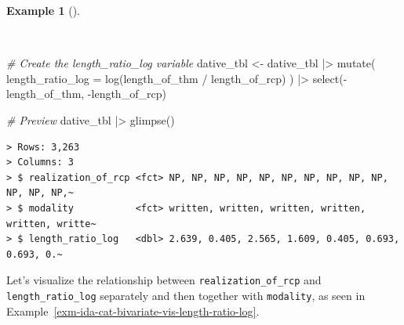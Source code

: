 \documentclass[
  letterpaper,
]{latex/krantz}
\newenvironment{Shaded}{\begin{snugshade}}{\end{snugshade}}
\newcommand{\AttributeTok}[1]{\textcolor[rgb]{0.00,0.00,0.00}{#1}}
\newcommand{\CommentTok}[1]{\textcolor[rgb]{0.00,0.00,0.00}{\textit{#1}}}
\newcommand{\FunctionTok}[1]{\textcolor[rgb]{0.00,0.00,0.00}{#1}}
\newcommand{\NormalTok}[1]{\textcolor[rgb]{0.00,0.00,0.00}{#1}}
\newcommand{\OtherTok}[1]{\textcolor[rgb]{0.00,0.00,0.00}{#1}}
\newcommand{\SpecialCharTok}[1]{\textcolor[rgb]{0.00,0.00,0.00}{#1}}
\theoremstyle{definition}
\newtheorem{example}{Example}[chapter]
\theoremstyle{remark}
\begin{document}
\begin{example}[]\protect\hypertarget{exm-ida-cat-create-length-ratio}{}\label{exm-ida-cat-create-length-ratio}

~

\begin{Shaded}
\begin{Highlighting}[]
\CommentTok{\# Create the \textasciigrave{}length\_ratio\_log\textasciigrave{} variable}
\NormalTok{dative\_tbl }\OtherTok{\textless{}{-}}
\NormalTok{  dative\_tbl }\SpecialCharTok{|\textgreater{}}
  \FunctionTok{mutate}\NormalTok{(}
    \AttributeTok{length\_ratio\_log =} \FunctionTok{log}\NormalTok{(length\_of\_thm }\SpecialCharTok{/}\NormalTok{ length\_of\_rcp)}
\NormalTok{  ) }\SpecialCharTok{|\textgreater{}}
  \FunctionTok{select}\NormalTok{(}\SpecialCharTok{{-}}\NormalTok{length\_of\_thm, }\SpecialCharTok{{-}}\NormalTok{length\_of\_rcp)}

\CommentTok{\# Preview}
\NormalTok{dative\_tbl }\SpecialCharTok{|\textgreater{}} \FunctionTok{glimpse}\NormalTok{()}
\end{Highlighting}
\end{Shaded}

\begin{verbatim}
> Rows: 3,263
> Columns: 3
> $ realization_of_rcp <fct> NP, NP, NP, NP, NP, NP, NP, NP, NP, NP, NP, NP, NP,~
> $ modality           <fct> written, written, written, written, written, writte~
> $ length_ratio_log   <dbl> 2.639, 0.405, 2.565, 1.609, 0.405, 0.693, 0.693, 0.~
\end{verbatim}

\end{example}

Let's visualize the relationship between \texttt{realization\_of\_rcp}
and \texttt{length\_ratio\_log} separately and then together with
\texttt{modality}, as seen in
Example~\ref{exm-ida-cat-bivariate-vis-length-ratio-log}.
\end{document}
